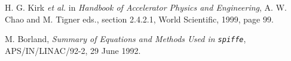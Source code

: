 \documentclass[11pt]{article}
\begin{document}





















\newpage
\begin{thebibliography}{1}

 H. G. Kirk {\em et al.} in {\em Handbook of Accelerator
Physics and Engineering}, A. W. Chao and M. Tigner eds., section 2.4.2.1,
World Scientific, 1999, page 99.

 M. Borland, {\em Summary of Equations and Methods
        Used in {\tt spiffe}}, APS/IN/LINAC/92-2, 29 June 1992.

\end{thebibliography}
\end{document}
